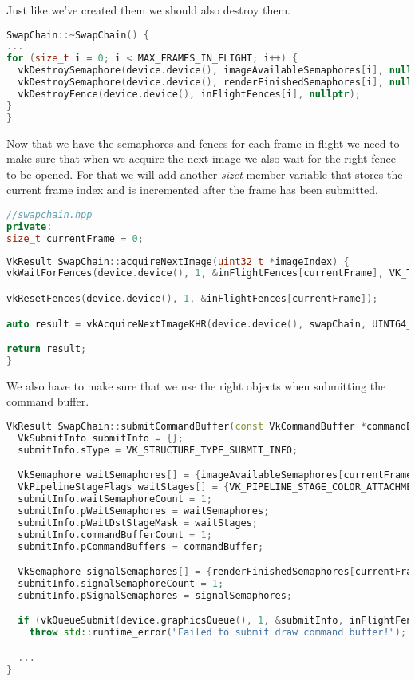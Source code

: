 \documentclass[12pt]{report} \usepackage{preamble}
\begin{document}
Just like we've created them we should also destroy them.

\begin{lstlisting}[language=C++]
SwapChain::~SwapChain() {
...
for (size_t i = 0; i < MAX_FRAMES_IN_FLIGHT; i++) {
  vkDestroySemaphore(device.device(), imageAvailableSemaphores[i], nullptr);
  vkDestroySemaphore(device.device(), renderFinishedSemaphores[i], nullptr);
  vkDestroyFence(device.device(), inFlightFences[i], nullptr);
}
}
\end{lstlisting}

Now that we have the semaphores and fences for each frame in flight we need to make sure that when we acquire the next image we also
wait for the right fence to be opened. For that we will add another \textit{size\textunderscore t} member variable that stores the
current frame index and is incremented after the frame has been submitted.

\begin{lstlisting}[language=C++]
//swapchain.hpp
private:
size_t currentFrame = 0;
\end{lstlisting}

\begin{lstlisting}[language=C++]
VkResult SwapChain::acquireNextImage(uint32_t *imageIndex) {
vkWaitForFences(device.device(), 1, &inFlightFences[currentFrame], VK_TRUE, UINT64_MAX);

vkResetFences(device.device(), 1, &inFlightFences[currentFrame]);

auto result = vkAcquireNextImageKHR(device.device(), swapChain, UINT64_MAX, imageAvailableSemaphores[currentFrame], VK_NULL_HANDLE, imageIndex);

return result;
}
\end{lstlisting}

We also have to make sure that we use the right objects when submitting the command buffer.

\begin{lstlisting}[language=C++]
VkResult SwapChain::submitCommandBuffer(const VkCommandBuffer *commandBuffer, uint32_t *imageIndex) {
  VkSubmitInfo submitInfo = {};
  submitInfo.sType = VK_STRUCTURE_TYPE_SUBMIT_INFO;

  VkSemaphore waitSemaphores[] = {imageAvailableSemaphores[currentFrame]};
  VkPipelineStageFlags waitStages[] = {VK_PIPELINE_STAGE_COLOR_ATTACHMENT_OUTPUT_BIT};
  submitInfo.waitSemaphoreCount = 1;
  submitInfo.pWaitSemaphores = waitSemaphores;
  submitInfo.pWaitDstStageMask = waitStages;
  submitInfo.commandBufferCount = 1;
  submitInfo.pCommandBuffers = commandBuffer;

  VkSemaphore signalSemaphores[] = {renderFinishedSemaphores[currentFrame]};
  submitInfo.signalSemaphoreCount = 1;
  submitInfo.pSignalSemaphores = signalSemaphores;

  if (vkQueueSubmit(device.graphicsQueue(), 1, &submitInfo, inFlightFences[currentFrame]) != VK_SUCCESS)
    throw std::runtime_error("Failed to submit draw command buffer!");

  ...
}
\end{lstlisting}
\end{document}
